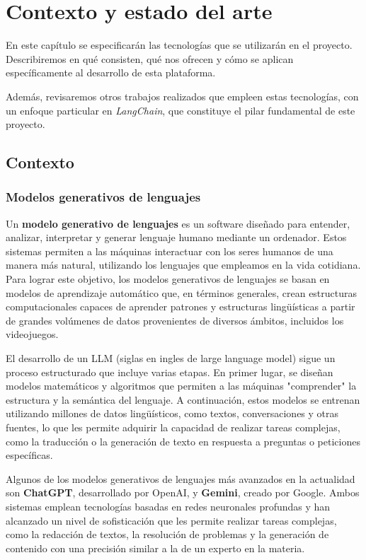 
\chapter{Contexto y estado del arte }

En este capítulo se especificarán las tecnologías que se utilizarán en el proyecto. Describiremos en qué consisten, qué nos ofrecen y cómo se aplican específicamente al desarrollo de esta plataforma. 

Además, revisaremos otros trabajos realizados que empleen estas tecnologías, con un enfoque particular en \textit{LangChain}, que constituye el pilar fundamental de este proyecto.  

\newpage

\section{Contexto}

\subsection{Modelos generativos de lenguajes}

Un \textbf{modelo generativo de lenguajes} es un software diseñado para entender, analizar, interpretar y generar lenguaje humano mediante un ordenador. Estos sistemas permiten a las máquinas interactuar con los seres humanos de una manera más natural, utilizando los lenguajes que empleamos en la vida cotidiana. Para lograr este objetivo, los modelos generativos de lenguajes se basan en modelos de aprendizaje automático que, en términos generales, crean estructuras computacionales capaces de aprender patrones y estructuras lingüísticas a partir de grandes volúmenes de datos provenientes de diversos ámbitos, incluidos los videojuegos.

El desarrollo de un LLM (siglas en ingles de large language model) sigue un proceso estructurado que incluye varias etapas. En primer lugar, se diseñan modelos matemáticos y algoritmos que permiten a las máquinas "comprender" la estructura y la semántica del lenguaje. A continuación, estos modelos se entrenan utilizando millones de datos lingüísticos, como textos, conversaciones y otras fuentes, lo que les permite adquirir la capacidad de realizar tareas complejas, como la traducción o la generación de texto en respuesta a preguntas o peticiones específicas.

Algunos de los modelos generativos de lenguajes más avanzados en la actualidad son \textbf{ChatGPT}, desarrollado por OpenAI, y \textbf{Gemini}, creado por Google. Ambos sistemas emplean tecnologías basadas en redes neuronales profundas y han alcanzado un nivel de sofisticación que les permite realizar tareas complejas, como la redacción de textos, la resolución de problemas y la generación de contenido con una precisión similar a la de un experto en la materia.


